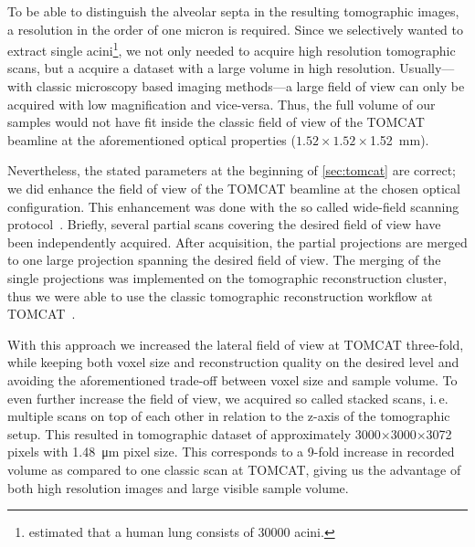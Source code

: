 \documentclass[%
	paper=a4,%
	twoside=true,%
	draft=false,%
	abstract=false]{scrartcl}
\newcommand{\ie}{i.\,e.\xspace}
\newcommand{\todojcs}[2][]{\todo[color=magenta!62!white, #1]{Johannes: #2}}
\begin{document}
To be able to distinguish the alveolar septa \todojcs{How thick are they in the rat: approx.~\SI{8}{\micro\meter}?} in the resulting tomographic images, a resolution in the order of one micron is required. Since we selectively wanted to extract single acini\footnote{\citet{Weibel1997} estimated that a human lung consists of \num{30000} acini.}, we not only needed to acquire high resolution tomographic scans, but a acquire a dataset with a large volume in high resolution. Usually---with classic microscopy based imaging methods---a large field of view can only be acquired with low magnification and vice-versa. Thus, the full volume of our samples would not have fit inside the classic field of view of the TOMCAT beamline at the aforementioned optical properties (\(1.52\times1.52\times\)\SI{1.52}{\milli\meter}).

Nevertheless, the stated parameters at the beginning of \autoref{sec:tomcat} are correct; we did enhance the field of view of the TOMCAT beamline at the chosen optical configuration. This enhancement was done with the so called wide-field scanning protocol~\cite{Haberthuer2010}. Briefly, several partial scans covering the desired field of view have been independently acquired. After acquisition, the partial projections are merged to one large projection spanning the desired field of view. The merging of the single projections was implemented on the tomographic reconstruction cluster, thus we were able to use the classic tomographic reconstruction workflow at TOMCAT~\cite{Hintermueller2010}.

With this approach we increased the lateral field of view at TOMCAT three-fold, while keeping both voxel size and reconstruction quality on the desired level and avoiding the aforementioned trade-off between voxel size and sample volume. To even further increase the field of view, we acquired so called stacked scans, \ie multiple scans on top of each other in relation to the z-axis of the tomographic setup. This resulted in tomographic dataset of approximately 3000\(\times\)3000\(\times\)3072 pixels  with \SI{1.48}{\micro\meter} pixel size. This corresponds to a 9-fold increase in recorded volume as compared to one classic scan at TOMCAT, giving us the advantage of both high resolution images and large visible sample volume.
\end{document}
